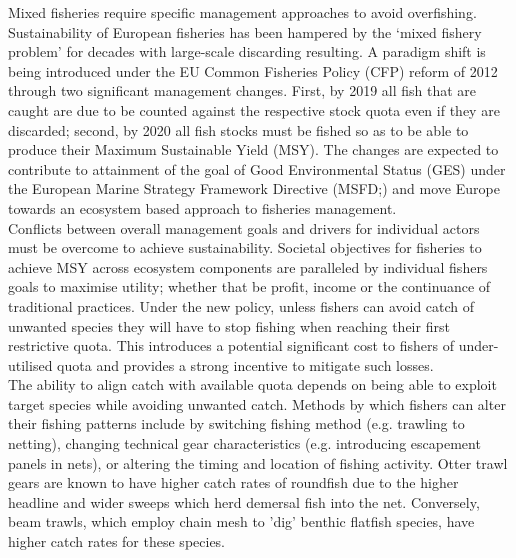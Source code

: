 \documentclass[fleqn,10pt]{wlscirep}
\begin{document}
\begin{linenumbers}
Mixed fisheries require specific management approaches to avoid overfishing.
Sustainability of European fisheries has been hampered by the `mixed fishery
problem' for decades with large-scale discarding resulting\cite{Borges2015,
	Uhlmann2014}.  A paradigm shift is being introduced under the EU Common
Fisheries Policy (CFP) reform of 2012 through two significant management
changes.  First, by 2019 all fish that are caught are due to be counted against
the respective stock quota even if they are discarded; second, by 2020 all fish
stocks must be fished so as to be able to produce their Maximum Sustainable
Yield (MSY)\cite{EuropeanParliamentandCounciloftheEuropeanUnion2013}. The
changes are expected to contribute to attainment of the goal of Good
Environmental Status (GES) under the European Marine Strategy Framework
Directive (MSFD;\cite{EuropeanParliament2008}) and move Europe towards an
ecosystem based approach to fisheries management\cite{Garcia2003}. \\

Conflicts between overall management goals and drivers for individual actors
must be overcome to achieve sustainability. Societal objectives for fisheries
to achieve MSY across ecosystem components are paralleled by individual fishers
goals to maximise utility; whether that be profit, income or the continuance of
traditional practices.  Under the new policy, unless fishers can avoid catch of
unwanted species they will have to stop fishing when reaching their first
restrictive quota. This introduces a potential significant cost to fishers of
under-utilised quota\cite{Hoff2010a, Ulrich2016} and provides a strong
incentive to mitigate such losses\cite{Condie2013, Condie2013a}. \\

The ability to align catch with available quota depends on being able to
exploit target species while avoiding unwanted catch. Methods by which fishers
can alter their fishing patterns include by switching fishing method (e.g.
trawling to netting), changing technical gear characteristics (e.g.
introducing escapement panels in nets), or altering the timing and location of
fishing activity\cite{Fulton2011b, vanPutten2012a}.  Otter trawl gears are
known to have higher catch rates of roundfish due to the higher headline and
wider sweeps which herd demersal fish into the net.  Conversely, beam trawls,
which employ chain mesh to 'dig' benthic flatfish species, have higher catch
rates for these species\cite{Fraser2008}.\\


\end{linenumbers}
\end{document}
